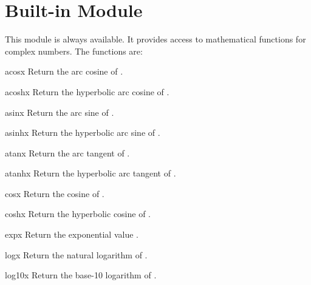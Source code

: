 \section{Built-in Module }
\label{module-cmath}

\renewcommand{\indexsubitem}{(in module cmath)}
This module is always available.
It provides access to mathematical functions for complex numbers.
The functions are:

\begin{funcdesc}{acos}{x}
Return the arc cosine of .
\end{funcdesc}

\begin{funcdesc}{acosh}{x}
Return the hyperbolic arc cosine of .
\end{funcdesc}

\begin{funcdesc}{asin}{x}
Return the arc sine of .
\end{funcdesc}

\begin{funcdesc}{asinh}{x}
Return the hyperbolic arc sine of .
\end{funcdesc}

\begin{funcdesc}{atan}{x}
Return the arc tangent of .
\end{funcdesc}

\begin{funcdesc}{atanh}{x}
Return the hyperbolic arc tangent of .
\end{funcdesc}

\begin{funcdesc}{cos}{x}
Return the cosine of .
\end{funcdesc}

\begin{funcdesc}{cosh}{x}
Return the hyperbolic cosine of .
\end{funcdesc}

\begin{funcdesc}{exp}{x}
Return the exponential value .
\end{funcdesc}

\begin{funcdesc}{log}{x}
Return the natural logarithm of .
\end{funcdesc}

\begin{funcdesc}{log10}{x}
Return the base-10 logarithm of .
\end{funcdesc}

